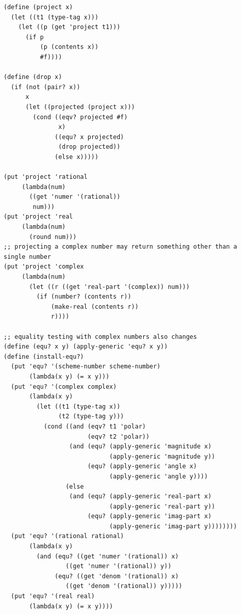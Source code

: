 \documentclass[final,fleqn,titlepage,twoside]{article}
\begin{document}
\begin{verbatim}
(define (project x)
  (let ((t1 (type-tag x)))
    (let ((p (get 'project t1)))
      (if p
          (p (contents x))
          #f))))

(define (drop x)
  (if (not (pair? x))
      x
      (let ((projected (project x)))
        (cond ((eqv? projected #f)
               x)
              ((equ? x projected)
               (drop projected))
              (else x)))))

(put 'project 'rational
     (lambda(num)
       ((get 'numer '(rational))
        num)))
(put 'project 'real
     (lambda(num)
       (round num)))
;; projecting a complex number may return something other than a single number
(put 'project 'complex
     (lambda(num)
       (let ((r ((get 'real-part '(complex)) num)))
         (if (number? (contents r))
             (make-real (contents r))
             r))))

;; equality testing with complex numbers also changes
(define (equ? x y) (apply-generic 'equ? x y))
(define (install-equ?)
  (put 'equ? '(scheme-number scheme-number)
       (lambda(x y) (= x y)))
  (put 'equ? '(complex complex)
       (lambda(x y)
         (let ((t1 (type-tag x))
               (t2 (type-tag y)))
           (cond ((and (eqv? t1 'polar)
                       (eqv? t2 'polar))
                  (and (equ? (apply-generic 'magnitude x)
                             (apply-generic 'magnitude y))
                       (equ? (apply-generic 'angle x)
                             (apply-generic 'angle y))))
                 (else
                  (and (equ? (apply-generic 'real-part x)
                             (apply-generic 'real-part y))
                       (equ? (apply-generic 'imag-part x)
                             (apply-generic 'imag-part y))))))))
  (put 'equ? '(rational rational)
       (lambda(x y)
         (and (equ? ((get 'numer '(rational)) x)
                 ((get 'numer '(rational)) y))
              (equ? ((get 'denom '(rational)) x)
                 ((get 'denom '(rational)) y)))))
  (put 'equ? '(real real)
       (lambda(x y) (= x y))))
\end{verbatim}
\end{document}
